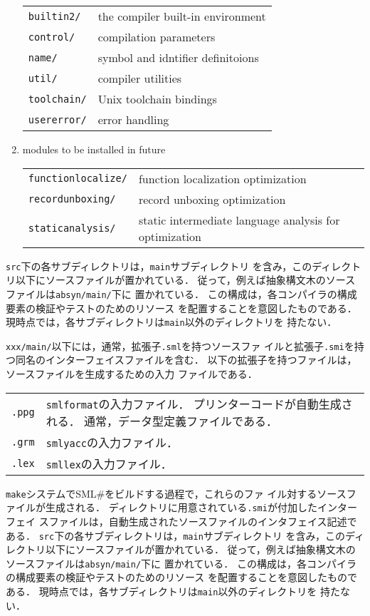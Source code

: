 \documentclass{jbook}
\newif\ifjp
\newcommand{\smlsharp}{SML\#}
\newcommand{\code}[1]{\mbox{\large\tt #1}}
\begin{document}
\begin{enumerate}
\begin{tabular}{ll}
\code{builtin2/}& the compiler built-in environment
\\
\code{control/}& compilation parameters
\\
\code{name/}& symbol and idntifier definitoions
\\
\code{util/}& compiler utilities
\\
\code{toolchain/}& Unix toolchain bindings
\\
\code{usererror/}& error handling
\end{tabular}

\item modules to be installed in future

\begin{tabular}{ll}
\code{functionlocalize/}& function localization optimization
\\
\code{recordunboxing/}& record unboxing optimization
\\
\code{staticanalysis/}& static intermediate language analysis for optimization
\end{tabular}
\end{enumerate}
\fi%

\ifjp%
	\code{src}下の各サブディレクトリは，\code{main}サブディレクトリ
を含み，このディレクトリ以下にソースファイルが置かれている．
	従って，例えば抽象構文木のソースファイルは\code{absyn/main/}下に
置かれている．
	この構成は，各コンパイラの構成要素の検証やテストのためのリソース
を配置することを意図したものである．
	現時点では，各サブディレクトリは\code{main}以外のディレクトリを
持たない．

	\code{xxx/main/}以下には，通常，拡張子\code{.sml}を持つソースファ
イルと拡張子\code{.smi}を持つ同名のインターフェイスファイルを含む．
	以下の拡張子を持つファイルは，ソースファイルを生成するための入力
ファイルである．

\begin{tabular}{ll}
\code{.ppg} &
\code{smlformat}の入力ファイル．
プリンターコードが自動生成される．
通常，データ型定義ファイルである．
\\
\code{.grm} &
\code{smlyacc}の入力ファイル．
\\
\code{.lex} &
\code{smllex}の入力ファイル．
\end{tabular}

	\code{make}システムで\smlsharp{}をビルドする過程で，これらのファ
イル対するソースファイルが生成される．
	ディレクトリに用意されている\code{.smi}が付加したインターフェイ
スファイルは，自動生成されたソースファイルのインタフェイス記述である．
\else%
	\code{src}下の各サブディレクトリは，\code{main}サブディレクトリ
を含み，このディレクトリ以下にソースファイルが置かれている．
	従って，例えば抽象構文木のソースファイルは\code{absyn/main/}下に
置かれている．
	この構成は，各コンパイラの構成要素の検証やテストのためのリソース
を配置することを意図したものである．
	現時点では，各サブディレクトリは\code{main}以外のディレクトリを
持たない．
\end{document}
